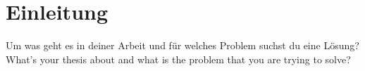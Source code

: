\chapter{Einleitung}\label{chapter:einleitung}

Um was geht es in deiner Arbeit und für welches Problem suchst du eine Lösung?
What's your thesis about and what is the problem that you are trying to solve?

\clearpage

